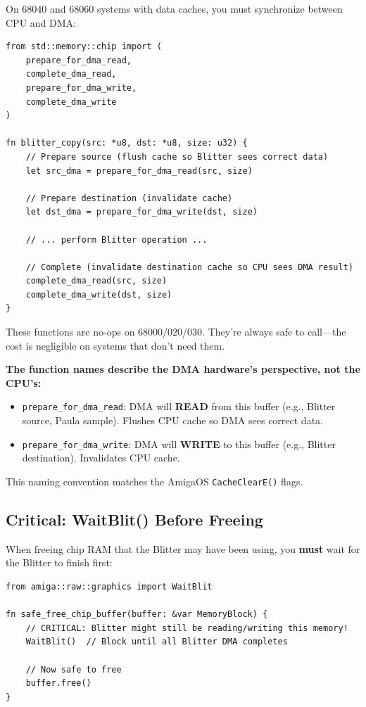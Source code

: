 On 68040 and 68060 systems with data caches, you must synchronize between CPU and DMA:

\begin{lstlisting}
from std::memory::chip import (
    prepare_for_dma_read,
    complete_dma_read,
    prepare_for_dma_write,
    complete_dma_write
)

fn blitter_copy(src: *u8, dst: *u8, size: u32) {
    // Prepare source (flush cache so Blitter sees correct data)
    let src_dma = prepare_for_dma_read(src, size)

    // Prepare destination (invalidate cache)
    let dst_dma = prepare_for_dma_write(dst, size)

    // ... perform Blitter operation ...

    // Complete (invalidate destination cache so CPU sees DMA result)
    complete_dma_read(src, size)
    complete_dma_write(dst, size)
}
\end{lstlisting}

\begin{notebox}
These functions are no-ops on 68000/020/030. They're always safe to call---the cost is negligible on systems that don't need them.
\end{notebox}

\begin{warningbox}
\textbf{The function names describe the DMA hardware's perspective, not the CPU's:}
\begin{itemize}
    \item \texttt{prepare\_for\_dma\_read}: DMA will \textbf{READ} from this buffer (e.g., Blitter source, Paula sample). Flushes CPU cache so DMA sees correct data.
    \item \texttt{prepare\_for\_dma\_write}: DMA will \textbf{WRITE} to this buffer (e.g., Blitter destination). Invalidates CPU cache.
\end{itemize}
This naming convention matches the AmigaOS \texttt{CacheClearE()} flags.
\end{warningbox}

\subsection{Critical: WaitBlit() Before Freeing}

When freeing chip RAM that the Blitter may have been using, you \textbf{must} wait for the Blitter to finish first:

\begin{lstlisting}
from amiga::raw::graphics import WaitBlit

fn safe_free_chip_buffer(buffer: &var MemoryBlock) {
    // CRITICAL: Blitter might still be reading/writing this memory!
    WaitBlit()  // Block until all Blitter DMA completes

    // Now safe to free
    buffer.free()
}
\end{lstlisting}

